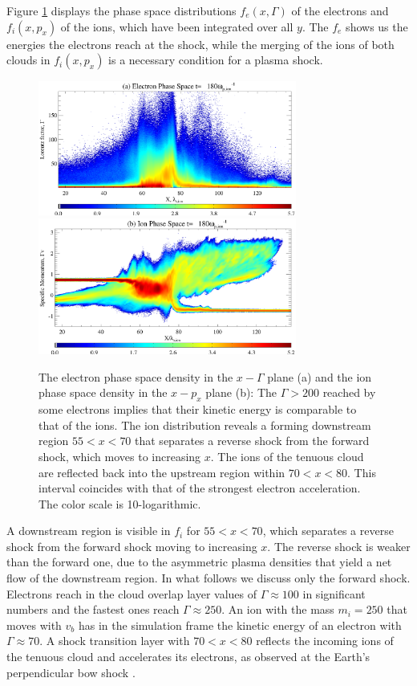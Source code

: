 \documentclass[twocolumn,showpacs,preprintnumbers,amsmath,amssymb]{revtex4}
\begin{document}
Figure \ref{fig2} displays the phase space distributions $f_e (x,\Gamma)$ of the electrons and 
$f_i (x,p_x)$ of the ions, which have been integrated over all $y$. The $f_e$ shows us the energies 
the electrons reach at the shock, while the merging of the ions of both clouds in $f_i (x,p_x)$ is 
a necessary condition for a plasma shock. 
\begin{figure}
\includegraphics[width=8.5cm]{Fig2a.eps}
\includegraphics[width=8.5cm]{Fig2b.eps}
\caption{The electron phase space density in the $x-\Gamma$ plane (a) and the ion phase space density 
in the $x-p_x$ plane (b): The $\Gamma > 200$ reached by some electrons implies that their kinetic energy 
is comparable to that of the ions. The ion distribution reveals a forming downstream region $55<x<70$
that separates a reverse shock from the forward shock, which moves to increasing $x$. The ions of the
tenuous cloud are reflected back into the upstream region within $70<x<80$. This interval coincides 
with that of the strongest electron acceleration. The color scale is 10-logarithmic.\label{fig2}}
\end{figure}
A downstream region is visible in $f_i$ for $55<x<70$, which separates a reverse shock from the forward 
shock moving to increasing $x$. The reverse shock is weaker than the forward one, due to the asymmetric
plasma densities that yield a net flow of the downstream region. In what follows we discuss only the 
forward shock. Electrons reach in the cloud overlap layer values of $\Gamma \approx 100$ in significant 
numbers and the fastest ones reach $\Gamma \approx 250$. An ion with the mass $m_i =250$ that moves with 
$v_b$ has in the simulation frame the kinetic energy of an electron with $\Gamma \approx 70$. A shock 
transition layer with $70<x<80$ reflects the incoming ions of the tenuous cloud and accelerates its 
electrons, as observed at the Earth's perpendicular bow shock \cite{Anderson}.
\end{document}
